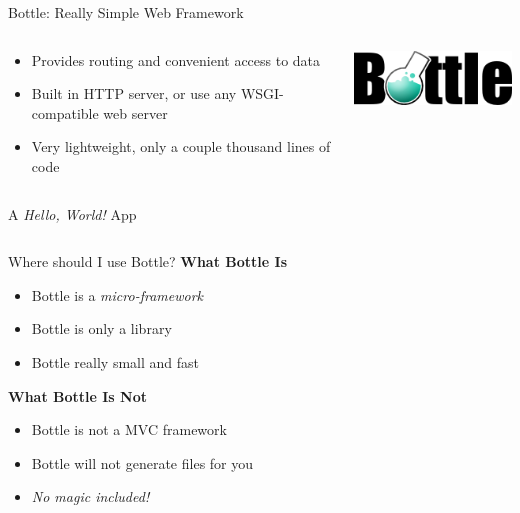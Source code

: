 \documentclass{lug}
\begin{document}
\begin{frame}{Bottle: Really Simple Web Framework}
    \begin{columns}
        \begin{column}{0.7\linewidth}
            \begin{itemize}[<+->]
                \item Provides routing and convenient access to data
                \item Built in HTTP server, or use any WSGI-compatible web
                    server
                \item Very lightweight, only a couple thousand lines of code
            \end{itemize}
        \end{column}
        \begin{column}{0.3\linewidth}
            \includegraphics[width=\linewidth]{graphics/bottle}
        \end{column}
    \end{columns}

    \pause[\thebeamerpauses]
    \bigskip

    \begin{block}{A \emph{Hello, World!} App}
        \begin{minipage}{\linewidth}
            \tiny
            \inputminted{python3}{examples/bottle_ex.py}
        \end{minipage}
    \end{block}
\end{frame}

\begin{frame}{Where should I use Bottle?}
    \textbf{What Bottle Is}

    \begin{itemize}[<+->]
        \item Bottle is a \emph{micro-framework}
        \item Bottle is only a library
        \item Bottle really small and fast
    \end{itemize}

    \pause[\thebeamerpauses]

    \textbf{What Bottle Is Not}

    \begin{itemize}[<+->]
        \item Bottle is not a MVC framework
        \item Bottle will not generate files for you
        \item \emph{No magic included!}
    \end{itemize}
\end{frame}
\end{document}
